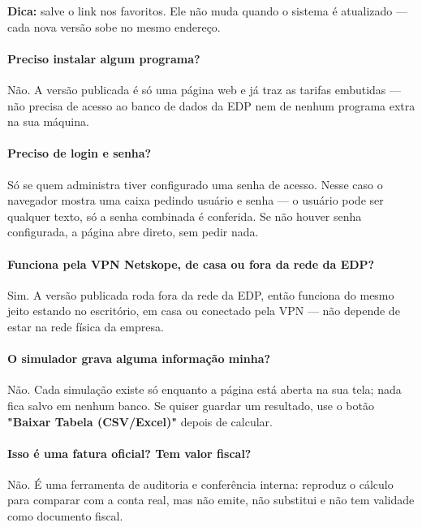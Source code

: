 \documentclass[11pt,a4paper]{article}
\begin{document}
\begin{tipbox}
\textbf{Dica:} salve o link nos favoritos. Ele não muda quando o sistema é atualizado --- cada nova versão sobe no mesmo endereço.
\end{tipbox}

\paragraph{Preciso instalar algum programa?}
Não. A versão publicada é só uma página web e já traz as tarifas embutidas --- não precisa de acesso ao banco de dados da EDP nem de nenhum programa extra na sua máquina.

\paragraph{Preciso de login e senha?}
Só se quem administra tiver configurado uma senha de acesso. Nesse caso o navegador mostra uma caixa pedindo usuário e senha --- o usuário pode ser qualquer texto, só a senha combinada é conferida. Se não houver senha configurada, a página abre direto, sem pedir nada.

\paragraph{Funciona pela VPN Netskope, de casa ou fora da rede da EDP?}
Sim. A versão publicada roda fora da rede da EDP, então funciona do mesmo jeito estando no escritório, em casa ou conectado pela VPN --- não depende de estar na rede física da empresa.

\paragraph{O simulador grava alguma informação minha?}
Não. Cada simulação existe só enquanto a página está aberta na sua tela; nada fica salvo em nenhum banco. Se quiser guardar um resultado, use o botão \textbf{"Baixar Tabela (CSV/Excel)"} depois de calcular.

\paragraph{Isso é uma fatura oficial? Tem valor fiscal?}
Não. É uma ferramenta de auditoria e conferência interna: reproduz o cálculo para comparar com a conta real, mas não emite, não substitui e não tem validade como documento fiscal.

\end{document}
